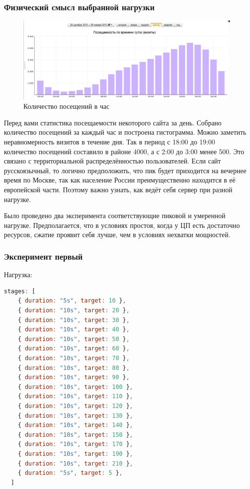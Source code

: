 \documentclass[12pt]{article}
\begin{document}
\subsubsection{ Физический смысл выбранной нагрузки }

\begin{figure}[H]
    \centering
    \includegraphics[width=1\textwidth]{../images/pedsovet.png}
    \caption{Количество посещений в час}
\end{figure}

Перед вами статистика посещаемости некоторого сайта за день. Собрано количество посещений за каждый час и построена гистограмма.
Можно заметить неравномерность визитов в течение дня. Так в период с 18:00 до 19:00 количество посещений составило в районе 4000, а с 2:00 до 3:00 менее 500. Это связано с территориальной распределённостью пользователей. Если сайт русскоязычный, то логично предположить, что пик будет приходится на вечернее время по Москве, так как население России преимущественно находится в её европейской части. Поэтому важно узнать, как ведёт себя сервер при разной нагрузке.

Было проведено два эксперимента соответствующие пиковой и умеренной нагрузке. Предполагается, что в условиях простоя, когда у ЦП есть достаточно ресурсов, сжатие проявит себя лучше, чем в условиях нехватки мощностей.

\subsubsection{Эксперимент первый}

Нагрузка:

\begin{lstlisting}[language=JavaScript]
  stages: [
    { duration: "5s", target: 10 },
    { duration: "10s", target: 20 },
    { duration: "10s", target: 30 },
    { duration: "10s", target: 40 },
    { duration: "10s", target: 50 },
    { duration: "10s", target: 60 },
    { duration: "10s", target: 70 },
    { duration: "10s", target: 80 },
    { duration: "10s", target: 90 },
    { duration: "10s", target: 100 },
    { duration: "10s", target: 110 },
    { duration: "10s", target: 120 },
    { duration: "10s", target: 130 },
    { duration: "10s", target: 140 },
    { duration: "10s", target: 150 },
    { duration: "10s", target: 170 },
    { duration: "10s", target: 190 },
    { duration: "10s", target: 210 },
    { duration: "5s", target: 5 },
  ]
\end{lstlisting}
\end{document}
